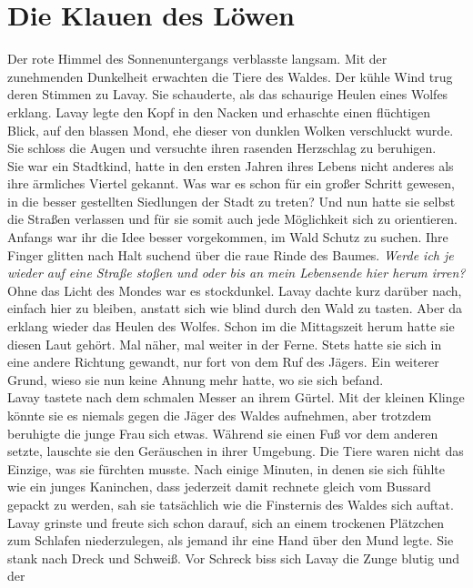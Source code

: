 \chapter{Die Klauen des Löwen}

Der rote Himmel des Sonnenuntergangs verblasste langsam. Mit der zunehmenden Dunkelheit erwachten 
die Tiere des Waldes. Der kühle Wind trug deren Stimmen zu Lavay. Sie schauderte, als das schaurige 
Heulen eines Wolfes erklang. Lavay legte den Kopf in den Nacken und erhaschte einen flüchtigen 
Blick, auf den blassen Mond, ehe dieser von dunklen Wolken verschluckt wurde. Sie schloss die Augen 
und versuchte ihren rasenden Herzschlag zu beruhigen.\\
Sie war ein Stadtkind, hatte in den ersten Jahren ihres Lebens nicht anderes als ihre ärmliches 
Viertel gekannt. Was war es schon für ein großer Schritt gewesen, in die besser gestellten 
Siedlungen der Stadt zu treten? Und nun hatte sie selbst die Straßen verlassen und für sie somit 
auch jede Möglichkeit sich zu orientieren. Anfangs war ihr die Idee besser vorgekommen, im Wald 
Schutz zu suchen. Ihre Finger glitten nach Halt suchend über die raue Rinde des Baumes. 
\textit{Werde ich je wieder auf eine Straße stoßen und oder bis an mein Lebensende hier herum 
irren?}\\
Ohne das Licht des Mondes war es stockdunkel. Lavay dachte kurz darüber nach, einfach hier zu 
bleiben, anstatt sich wie blind durch den Wald zu tasten. Aber da erklang wieder das Heulen des 
Wolfes. Schon im die Mittagszeit herum hatte sie diesen Laut gehört. Mal näher, mal weiter in der 
Ferne. Stets hatte sie sich in eine andere Richtung gewandt, nur fort von dem Ruf des Jägers. Ein 
weiterer Grund, wieso sie nun keine Ahnung mehr hatte, wo sie sich befand.\\ 
Lavay tastete nach dem schmalen Messer an ihrem Gürtel. Mit der kleinen Klinge könnte sie es niemals 
gegen die Jäger des Waldes aufnehmen, aber trotzdem beruhigte die junge Frau sich etwas. Während 
sie einen Fuß vor dem anderen setzte, lauschte sie den Geräuschen in ihrer Umgebung. Die Tiere 
waren nicht das Einzige, was sie fürchten musste. Nach einige Minuten, in denen sie sich fühlte wie 
ein junges Kaninchen, dass jederzeit damit rechnete gleich vom Bussard gepackt zu werden, sah sie 
tatsächlich wie die Finsternis des Waldes sich auftat. Lavay grinste und freute sich schon darauf, 
sich an einem trockenen Plätzchen zum Schlafen niederzulegen, als jemand ihr eine Hand über den Mund 
legte. Sie stank nach Dreck und Schweiß. Vor Schreck biss sich Lavay die Zunge blutig und der 
